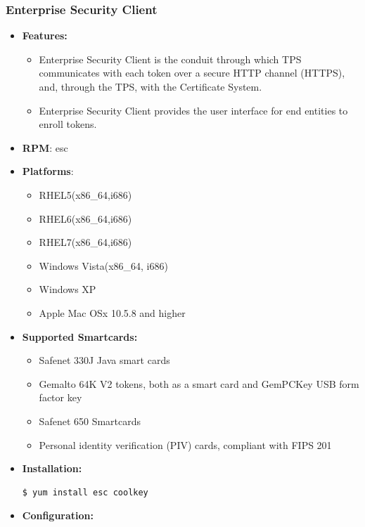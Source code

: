 \documentclass[a4paper]{article}
\begin{document}
\subsubsection{Enterprise Security Client}
    \begin{itemize}
        \item \textbf{Features:}
            \begin{itemize}
                \item Enterprise Security Client is the conduit through which TPS communicates with each token over a
                    secure HTTP channel (HTTPS), and, through the TPS, with the Certificate System.
                \item Enterprise Security Client provides the user interface for end entities to enroll tokens.
            \end{itemize}
        \item \textbf{RPM}: esc
        \item \textbf{Platforms}:
            \begin{itemize}
                \item RHEL5(x86\_64,i686)
                \item RHEL6(x86\_64,i686)
                \item RHEL7(x86\_64,i686)
                \item Windows Vista(x86\_64, i686)
                \item Windows XP
                \item Apple Mac OSx 10.5.8 and higher
            \end{itemize}
        \item \textbf{Supported Smartcards:}
             \begin{itemize}
                \item Safenet 330J Java smart cards
                \item Gemalto 64K V2 tokens, both as a smart card and GemPCKey USB form factor key
                \item Safenet 650 Smartcards
                \item Personal identity verification (PIV) cards, compliant with FIPS 201
            \end{itemize}
        \item \textbf{Installation:}
             \begin{lstlisting}[style=bashInputStyle]
$ yum install esc coolkey
            \end{lstlisting}
        \item \textbf{Configuration:}

\end{itemize}
\end{document}
